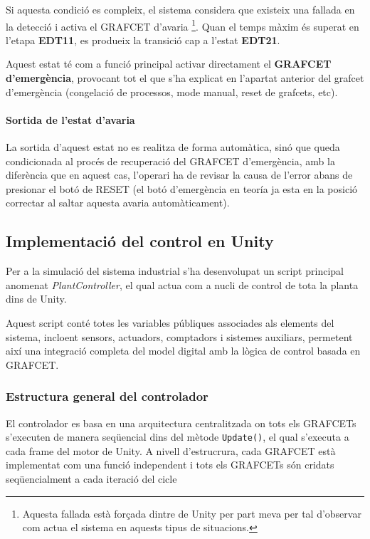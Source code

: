 \documentclass[a4paper,11pt,DIV=13,headings=normal,abstract=true,twoside=semi]{article}
\begin{document}
Si aquesta condició es compleix, el sistema considera que existeix una fallada en la detecció i activa el GRAFCET d'avaria \footnote{Aquesta fallada està forçada dintre de Unity per part meva per tal d'observar com actua el sistema en aquests tipus de situacions.}.  Quan el temps màxim és superat en l'etapa \textbf{EDT11}, es produeix la transició cap a l'estat \textbf{EDT21}.

Aquest estat té com a funció principal activar directament el \textbf{GRAFCET d'emergència}, provocant tot el que s'ha explicat en l'apartat anterior del grafcet d'emergència (congelació de processos, mode manual, reset de grafcets, etc).

\paragraph{Sortida de l'estat d'avaria}

La sortida d'aquest estat no es realitza de forma automàtica, sinó que queda condicionada al procés de recuperació del GRAFCET d'emergència, amb la diferència que en aquest cas, l'operari ha de revisar la causa de l'error abans de presionar el botó de RESET (el botó d'emergència en teoría ja esta en la posició correctar al saltar aquesta avaria automàticament).

\subsection{Implementació del control en Unity}
Per a la simulació del sistema industrial s'ha desenvolupat un script principal anomenat \textit{PlantController}, el qual actua com a nucli de control de tota la planta dins de Unity.

Aquest script conté totes les variables públiques associades als elements del sistema, incloent sensors, actuadors, comptadors i sistemes auxiliars, permetent així una integració completa del model digital amb la lògica de control basada en GRAFCET.

\subsubsection{Estructura general del controlador}

El controlador es basa en una arquitectura centralitzada on tots els GRAFCETs s'executen de manera seqüencial dins del mètode \texttt{Update()}, el qual s'executa a cada frame del motor de Unity. A nivell d'estrucrura, cada GRAFCET està implementat com una funció independent i tots els GRAFCETs són cridats seqüencialment a cada iteració del cicle
\end{document}

